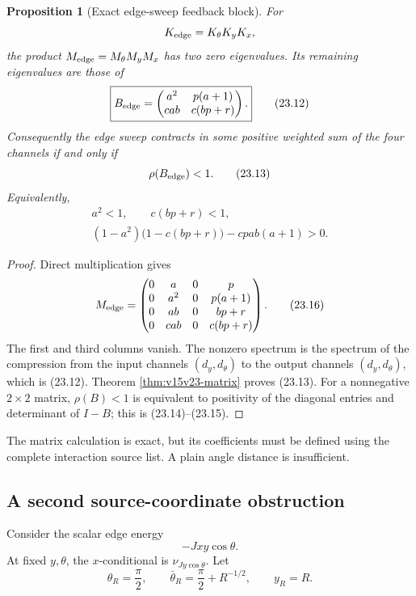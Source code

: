 \documentclass[11pt]{article}
\newtheorem{proposition}[theorem]{Proposition}
\theoremstyle{remark}
\begin{document}
\begin{proposition}[Exact edge-sweep feedback block]
\label{prop:v15v23-feedback}
For
\[
 K_{\rm edge}=K_\theta K_yK_x,
\]
the product \(M_{\rm edge}=M_\theta M_yM_x\) has two zero
eigenvalues.  Its remaining eigenvalues are those of
\[
 \boxed{
 B_{\rm edge}
 =
 \begin{pmatrix}
 a^2&p(a+1)\\
 cab&c(bp+r)
 \end{pmatrix}.}                                           \tag{23.12}
\]
Consequently the edge sweep contracts in some positive weighted
sum of the four channels if and only if
\[
 \rho(B_{\rm edge})<1.                                     \tag{23.13}
\]
Equivalently,
\[
\begin{gathered}
 a^2<1,\qquad c(bp+r)<1,                                   \tag{23.14}\\
 (1-a^2)\bigl(1-c(bp+r)\bigr)
 -cpab(a+1)>0.                                             \tag{23.15}
\end{gathered}
\]
\end{proposition}

\begin{proof}
Direct multiplication gives
\[
 M_{\rm edge}
 =
 \begin{pmatrix}
 0&a&0&p\\
 0&a^2&0&p(a+1)\\
 0&ab&0&bp+r\\
 0&cab&0&c(bp+r)
 \end{pmatrix}.                                            \tag{23.16}
\]
The first and third columns vanish.  The nonzero spectrum is the
spectrum of the compression from the input channels
\((d_y,d_\theta)\) to the output channels
\((d_y,d_\theta)\), which is (23.12).  Theorem
\ref{thm:v15v23-matrix} proves (23.13).  For a nonnegative
\(2\times2\) matrix, \(\rho(B)<1\) is equivalent to positivity of
the diagonal entries and determinant of \(I-B\); this is
(23.14)--(23.15).
\end{proof}

The matrix calculation is exact, but its coefficients must be
defined using the complete interaction source list.  A plain angle
distance is insufficient.

\subsection{A second source-coordinate obstruction}

Consider the scalar edge energy
\[
 -Jxy\cos\theta.
\]
At fixed \(y,\theta\), the \(x\)-conditional is
\(\nu_{Jy\cos\theta}\).  Let
\[
 \theta_R=\frac\pi2,\qquad
 \bar\theta_R=\frac\pi2+R^{-1/2},\qquad y_R=R.              \tag{23.17}
\]
\end{document}
